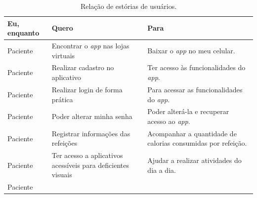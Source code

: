 \begin{table}[htb]
    \begin{center}
        \ABNTEXfontereduzida
        \caption{Relação de estórias de usuários.}
        \label{tab-est-usr}
        \begin{tabular}{p{2.0cm}|p{5.0cm}|p{7.0cm}}
            \textbf{Eu, enquanto}                                          & \textbf{Quero} & \textbf{Para}                     \\
            \hline
            Paciente                                                       &
            Encontrar o \emph{app} nas lojas virtuais                      &
            Baixar o \emph{app} no meu celular.                                                                                 \\
            \hline
            Paciente                                                       &
            Realizar cadastro no aplicativo                                &
            Ter acesso às funcionalidades do \emph{app}.                                                                        \\
            \hline
            Paciente                                                       &
            Realizar login de forma prática                                &
            Para acessar as funcionalidades do \emph{app}.                                                                      \\
            \hline
            Paciente                                                       &
            Poder alterar minha senha                                      &
            Poder alterá\@-la e recuperar acesso ao \emph{app}.                                                                 \\
            \hline
            Paciente                                                       &
            Registrar informações das refeições                            &
            Acompanhar a quantidade de calorias consumidas por refeição.                                                        \\
            \hline
            Paciente                                                       &
            Ter acesso a aplicativos acessíveis para deficientes visuais   &
            Ajudar a realizar atividades do dia a dia.                                                                          \\
            \hline
            Paciente                                                       &

\end{tabular}
\end{center}
\end{table}
